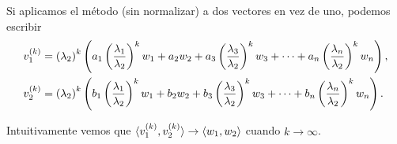 Si aplicamos el método (sin normalizar) a dos vectores en vez de uno, podemos escribir
{\small
$$
\begin{aligned}
\vb_1^{(k)} &= \left(\lambda_2\right)^k \left(a_1 \left(\frac{\lambda_1}{\lambda_2}\right)^k \wb_1 + a_2   \wb_2 + a_3 \left(\frac{\lambda_3}{\lambda_2}\right)^k \wb_3+ \dots + a_n \left(\frac{\lambda_n}{\lambda_2}\right)^k \wb_n \right), \\
\vb_2^{(k)} &= \left(\lambda_2\right)^k \left(b_1 \left(\frac{\lambda_1}{\lambda_2}\right)^k \wb_1 + b_2   \wb_2 + b_3 \left(\frac{\lambda_3}{\lambda_2}\right)^k \wb_3+ \dots + b_n \left(\frac{\lambda_n}{\lambda_2}\right)^k \wb_n \right). \\
\end{aligned}
$$
}

Intuitivamente vemos que $\langle \vb_1^{(k)}, \vb_2^{(k)} \rangle \rightarrow \langle \wb_1, \wb_2 \rangle$ cuando $k \rightarrow \infty$.

